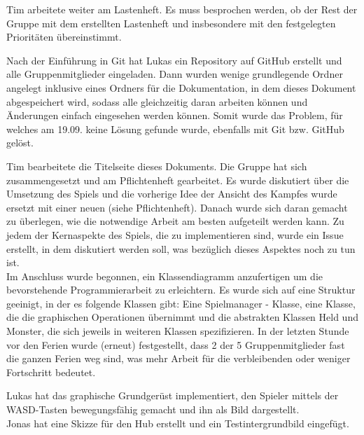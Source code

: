 
Tim arbeitete weiter am Lastenheft. Es muss besprochen werden, ob der Rest der Gruppe mit dem erstellten Lastenheft und insbesondere mit den festgelegten Prioritäten übereinstimmt. \\


Nach der Einführung in Git hat Lukas ein Repository auf GitHub erstellt und alle Gruppenmitglieder eingeladen. Dann wurden wenige grundlegende Ordner angelegt inklusive eines Ordners für die Dokumentation, in dem dieses Dokument abgespeichert wird, sodass alle \glqq{}gleichzeitig\grqq{} daran arbeiten können und Änderungen einfach eingesehen werden können. Somit wurde das Problem, für welches am 19.09. keine Lösung gefunde wurde, ebenfalls mit Git bzw. GitHub gelöst. \\


Tim bearbeitete die Titelseite dieses Dokuments. Die Gruppe hat sich zusammengesetzt und am Pflichtenheft gearbeitet. Es wurde diskutiert über die Umsetzung des Spiels und die vorherige Idee der Ansicht des Kampfes wurde ersetzt mit einer neuen (siehe Pflichtenheft). Danach wurde sich daran gemacht zu überlegen, wie die notwendige Arbeit am besten aufgeteilt werden kann. Zu jedem der Kernaspekte des Spiels, die zu implementieren sind, wurde ein \glqq{}Issue\grqq{} erstellt, in dem diskutiert werden soll, was bezüglich dieses Aspektes noch zu tun ist.\\
Im Anschluss wurde begonnen, ein Klassendiagramm anzufertigen um die bevorstehende Programmierarbeit zu erleichtern. Es wurde sich auf eine Struktur geeinigt, in der es folgende Klassen gibt: Eine \glqq{}Spielmanager\grqq{} - Klasse, eine Klasse, die die graphischen Operationen übernimmt und die abstrakten Klassen Held und Monster, die sich jeweils in weiteren Klassen spezifizieren. In der letzten Stunde vor den Ferien wurde (erneut) festgestellt, dass 2 der 5 Gruppenmitglieder fast die ganzen Ferien weg sind, was mehr Arbeit für die verbleibenden oder weniger Fortschritt bedeutet. \\


Lukas hat das graphische Grundgerüst implementiert, den Spieler mittels der WASD-Tasten bewegungsfähig gemacht und ihn als Bild dargestellt. \\
Jonas hat eine Skizze für den Hub erstellt und ein Testintergrundbild eingefügt. \\

